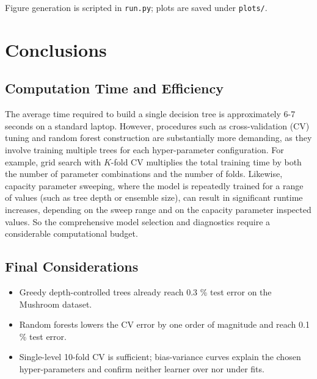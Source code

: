 \documentclass[12pt]{report}
\begin{document}
Figure generation is scripted in \texttt{run.py}; plots are saved under
\texttt{plots/}.

\section*{Conclusions}

\subsection{Computation Time and Efficiency}

The average time required to build a single decision tree is approximately 6-7 seconds 
on a standard laptop. However, procedures such as cross-validation (CV) tuning and random 
forest construction are substantially more demanding, as they involve training multiple 
trees for each hyper-parameter configuration. For example, grid search with $K$-fold CV 
multiplies the total training time by both the number of parameter combinations and the 
number of folds. Likewise, capacity parameter sweeping, where the model is repeatedly 
trained for a range of values (such as tree depth or ensemble size), can result in 
significant runtime increases, depending on the sweep range and on the capacity parameter 
inspected values. So the comprehensive model selection and diagnostics require a 
considerable computational budget.

\subsection{Final Considerations}

\begin{itemize}
  \item Greedy depth-controlled trees already reach 0.3 \% test error on the Mushroom dataset.
  \item Random forests lowers the CV error by one order of magnitude and reach 0.1 \% test error.
  \item Single-level 10-fold CV is sufficient; bias-variance curves explain the chosen 
        hyper-parameters and confirm neither learner over nor under fits.
\end{itemize}
\end{document}
